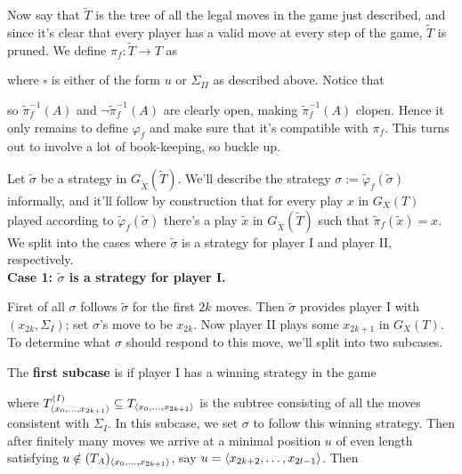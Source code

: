 {\qquad Now say that $\tilde T$ is the tree of all the legal moves in the game just described, and since it's clear that every player has a valid move at every step of the game, $\tilde T$ is pruned. We define $\pi_f:\tilde T\to T$ as

where $\square$ is either of the form $u$ or $\Sigma_{II}$ as described above. Notice that

so $\tilde\pi_f^{-1}(A)$ and $\lnot\tilde\pi_f^{-1}(A)$ are clearly open, making $\tilde\pi_f^{-1}(A)$ clopen. Hence it only remains to define $\varphi_f$ and make sure that it's compatible with $\pi_f$. This turns out to involve a lot of book-keeping, so buckle up.

\qquad Let $\tilde\sigma$ be a strategy in $G_{\tilde X}(\tilde T)$. We'll describe the strategy $\sigma:=\tilde\varphi_f(\tilde\sigma)$ informally, and it'll follow by construction that for every play $x$ in $G_X(T)$ played according to $\tilde\varphi_f(\tilde\sigma)$ there's a play $\tilde x$ in $G_{\tilde X}(\tilde T)$ such that $\tilde\pi_f(\tilde x)=x$. We split into the cases where $\tilde\sigma$ is a strategy for player I and player II, respectively.\\

\textbf{Case 1: $\tilde\sigma$ is a strategy for player I.}

First of all $\sigma$ follows $\tilde\sigma$ for the first $2k$ moves. Then $\tilde\sigma$ provides player I with $(x_{2k},\Sigma_I)$; set $\sigma$'s move to be $x_{2k}$. Now player II plays some $x_{2k+1}$ in $G_X(T)$. To determine what $\sigma$ should respond to this move, we'll split into two subcases.

\qquad The \textbf{first subcase} is if player I has a winning strategy in the game

where $T^{(I)}_{\langle x_0,\hdots,x_{2k+1}\rangle}\subseteq T_{\langle x_0,\hdots,x_{2k+1}\rangle}$ is the subtree consisting of all the moves consistent with $\Sigma_I$. In this subcase, we set $\sigma$ to follow this winning strategy. Then after finitely many moves we arrive at a minimal position $u$ of even length satisfying $u\notin(T_A)_{\langle x_0,\hdots,x_{2k+1}\rangle}$, say $u=\langle x_{2k+2},\hdots,x_{2l-1}\rangle$. Then

}
